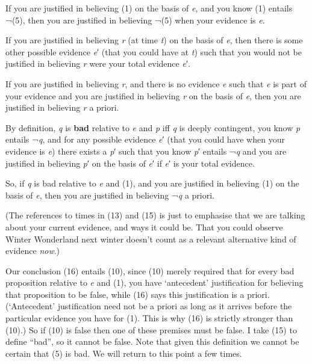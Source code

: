 \documentclass[
  11pt,
  letterpaper,
  DIV=11,
  numbers=noendperiod,
  twoside]{scrartcl}
\providecommand{\tightlist}{%
  \setlength{\itemsep}{0pt}\setlength{\parskip}{0pt}}
\begin{document}
\begin{description}
\tightlist
\item[(12)]
If you are justified in believing (1) on the basis of \emph{e}, and you
know (1) entails ¬(5), then you are justified in believing ¬(5) when
your evidence is \emph{e}.
\item[(13)]
If you are justified in believing \emph{r} (at time \emph{t}) on the
basis of \emph{e}, then there is some other possible evidence \emph{e}′
(that you could have at \emph{t}) such that you would not be justified
in believing \emph{r} were your total evidence \emph{e}′.
\item[(14)]
If you are justified in believing \emph{r}, and there is no evidence
\emph{e} such that \emph{e} is part of your evidence and you are
justified in believing \emph{r} on the basis of \emph{e}, then you are
justified in believing \emph{r} a priori.
\item[(15)]
By definition, \emph{q} is \textbf{bad} relative to \emph{e} and
\emph{p} iff \emph{q} is deeply contingent, you know \emph{p} entails
¬\emph{q}, and for any possible evidence \emph{e}′ (that you could have
when your evidence is \emph{e}) there exists a \emph{p}′ such that you
know \emph{p}′ entails ¬\emph{q} and you are justified in believing
\emph{p}′ on the basis of \emph{e}′ if \emph{e}′ is your total evidence.
\item[(16)]
So, if \emph{q} is bad relative to \emph{e} and (1), and you are
justified in believing (1) on the basis of \emph{e}, then you are
justified in believing ¬\emph{q} a priori.
\end{description}

(The references to times in (13) and (15) is just to emphasise that we
are talking about your current evidence, and ways it could be. That you
could observe Winter Wonderland next winter doesn't count as a relevant
alternative kind of evidence \emph{now}.)

Our conclusion (16) entails (10), since (10) merely required that for
every bad proposition relative to \emph{e} and (1), you have
`antecedent' justification for believing that proposition to be false,
while (16) says this justification is a priori. (`Antecedent'
justification need not be a priori as long as it arrives before the
particular evidence you have for (1). This is why (16) is strictly
stronger than (10).) So if (10) is false then one of these premises must
be false. I take (15) to define ``bad'', so it cannot be false. Note
that given this definition we cannot be certain that (5) is bad. We will
return to this point a few times.
\end{document}
